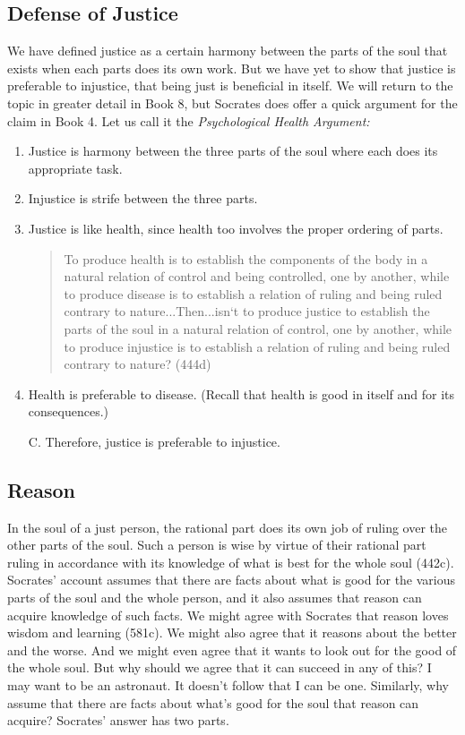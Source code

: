 \documentclass[oneside]{article}
\begin{document}
\thispagestyle{fancy}

\subsection*{Defense of Justice}
We have defined justice as a certain harmony between the parts of the soul that exists when each parts does its own work. But we have yet to show that justice is preferable to injustice, that being just is beneficial in itself. We will return to the topic in greater detail in Book 8, but Socrates does offer a quick argument for the claim in Book 4. Let us call it the \emph{Psychological Health Argument:}

\begin{enumerate}
\item Justice is harmony between the three parts of the soul where each does its appropriate task.
\item Injustice is strife between the three parts.
\item	Justice is like health, since health too involves the proper ordering of parts.  
\begin{quote}
To produce health is to establish the components of the body in a natural relation of control and being controlled, one by another, while to produce disease is to establish a relation of ruling and being ruled contrary to nature...Then...isn`t to produce justice to establish the parts of the soul in a natural relation of control, one by another, while to produce injustice is to establish a relation of ruling and being ruled contrary to nature? (444d)
\end{quote}
\item  Health is preferable to disease.  (Recall that health is good in itself and for its consequences.)
\item[C.]	Therefore, justice is preferable to injustice.
\end{enumerate}

\subsection*{Reason}
In the soul of a just person, the rational part does its own job of ruling over the other parts of the soul. Such a person is wise by virtue of their rational part ruling in accordance with its knowledge of what is best for the whole soul (442c).   Socrates' account assumes that there are facts about what is good for the various parts of the soul and the whole person, and it also assumes that reason can acquire knowledge of such facts. We might agree with Socrates that reason loves wisdom and learning (581c). We might also agree that it reasons about the better and the worse. And we might even agree that it wants to look out for the good of the whole soul. But why should we agree that it can succeed in any of this? I may want to be an astronaut. It doesn't follow that I can be one. Similarly, why assume that there are facts about what's good for the soul that reason can acquire? Socrates' answer has two parts. 
\end{document}
